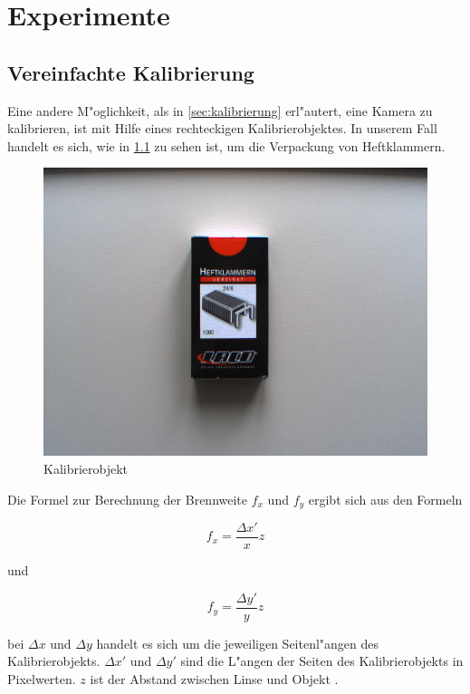 \chapter{Experimente}
\label{cha:experimente}

\section{Vereinfachte Kalibrierung}
\label{sec:vereinfachtekalib}

Eine andere M"oglichkeit, als in \ref{sec:kalibrierung} erl"autert, eine Kamera zu kalibrieren, ist mit Hilfe eines rechteckigen Kalibrierobjektes. In unserem Fall handelt es sich, wie in \ref{fig:klammern} zu sehen ist, um die Verpackung von Heftklammern.
 
\begin{figure}[H]
	\includegraphics[scale=0.5]{bilder/experimentcalib}
	\caption[Kalibrierobjekt]{Kalibrierobjekt}
	\label{fig:klammern}
\end{figure}

\noindent Die Formel zur Berechnung der Brennweite $f_x$ und $f_y$ ergibt sich aus den Formeln

\begin{equation}
f_x=\frac{\Delta x'}{x}z
\end{equation}

und

\begin{equation}
f_y=\frac{\Delta y'}{y}z
\end{equation}

\noindent bei $\Delta x$ und $\Delta y$ handelt es sich um die jeweiligen Seitenl"angen des Kalibrierobjekts.\newline
$\Delta x'$ und $\Delta y'$ sind die L"angen der Seiten des Kalibrierobjekts in Pixelwerten. $z$ ist der Abstand zwischen Linse und Objekt \cite{PCV} \cite{CVF}.

